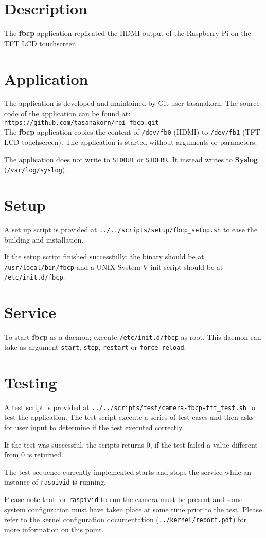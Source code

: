 \section{Description}
The \textbf{fbcp} application replicated the HDMI output of the Raspberry Pi on
the TFT LCD touchscreen.

\section{Application}
The application is developed and maintained by Git user tasanakorn. The source
code of the application can be found at:\\

\texttt{https://github.com/tasanakorn/rpi-fbcp.git}\\

The \textbf{fbcp} application copies the content of \texttt{/dev/fb0} (HDMI) to
\texttt{/dev/fb1} (TFT LCD touchscreen). The application is started without
arguments or parameters.

The application does not write to \texttt{STDOUT} or \texttt{STDERR}. It instead
writes to \textbf{Syslog} (\texttt{/var/log/syslog}).

\section{Setup}
A set up script is provided at \texttt{../../scripts/setup/fbcp\_setup.sh} to
ease the building and installation.

If the setup script finished successfully; the binary should be at\\
\texttt{/usr/local/bin/fbcp} and a UNIX System V init script should be at\\
\texttt{/etc/init.d/fbcp}.

\section{Service}
To start \textbf{fbcp} as a daemon; execute \texttt{/etc/init.d/fbcp}
as root. This daemon can take as argument \texttt{start}, \texttt{stop},
\texttt{restart} or \texttt{force-reload}.

\section{Testing}
A test script is provided at
\texttt{../../scripts/test/camera-fbcp-tft\_test.sh} to test the application.
The test script execute a series of test cases and then asks for user input to
determine if the test executed correctly.

If the test was successful, the scripts returns 0, if the test failed a value
different from 0 is returned.

The test sequence currently implemented starts and stops the service while an
instance of \texttt{raspivid} is running.

Please note that for \texttt{raspivid} to run the camera must be present and
some system configuration must have taken place at some time prior to the test.
Please refer to the kernel configuration documentation
(\texttt{../kernel/report.pdf}) for more information on this point.
